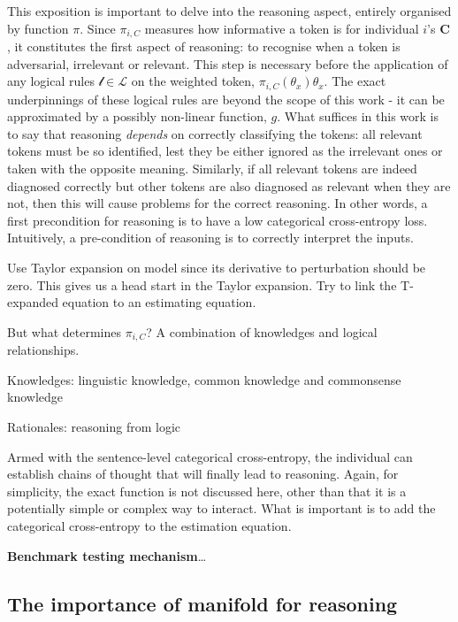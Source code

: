 \documentclass[
]{article}
\begin{document}
This exposition is important to delve into the reasoning aspect,
entirely organised by function \(\pi\). Since \(\pi_{i, C}\) measures
how informative a token is for individual \(i\)'s \(\mathbf{C}\), it
constitutes the first aspect of reasoning: to recognise when a token is
adversarial, irrelevant or relevant. This step is necessary before the
application of any logical rules \(\mathcal{l} \in \mathcal{L}\) on the
weighted token, \(\pi_{i, C}(\theta_x) \theta_x\). The exact
underpinnings of these logical rules are beyond the scope of this work -
it can be approximated by a possibly non-linear function, \(g\). What
suffices in this work is to say that reasoning \emph{depends} on
correctly classifying the tokens: all relevant tokens must be so
identified, lest they be either ignored as the irrelevant ones or taken
with the opposite meaning. Similarly, if all relevant tokens are indeed
diagnosed correctly but other tokens are also diagnosed as relevant when
they are not, then this will cause problems for the correct reasoning.
In other words, a first precondition for reasoning is to have a low
categorical cross-entropy loss. Intuitively, a pre-condition of
reasoning is to correctly interpret the inputs.

Use Taylor expansion on model since its derivative to perturbation
should be zero. This gives us a head start in the Taylor expansion. Try
to link the T-expanded equation to an estimating equation.

But what determines \(\pi_{i, C}\)? A combination of knowledges and
logical relationships.

Knowledges: linguistic knowledge, common knowledge and commonsense
knowledge

Rationales: reasoning from logic

Armed with the sentence-level categorical cross-entropy, the individual
can establish chains of thought that will finally lead to reasoning.
Again, for simplicity, the exact function is not discussed here, other
than that it is a potentially simple or complex way to interact. What is
important is to add the categorical cross-entropy to the estimation
equation.

\textbf{Benchmark testing mechanism}\ldots{}

\subsection{The importance of manifold for
reasoning}\label{the-importance-of-manifold-for-reasoning}
\end{document}

